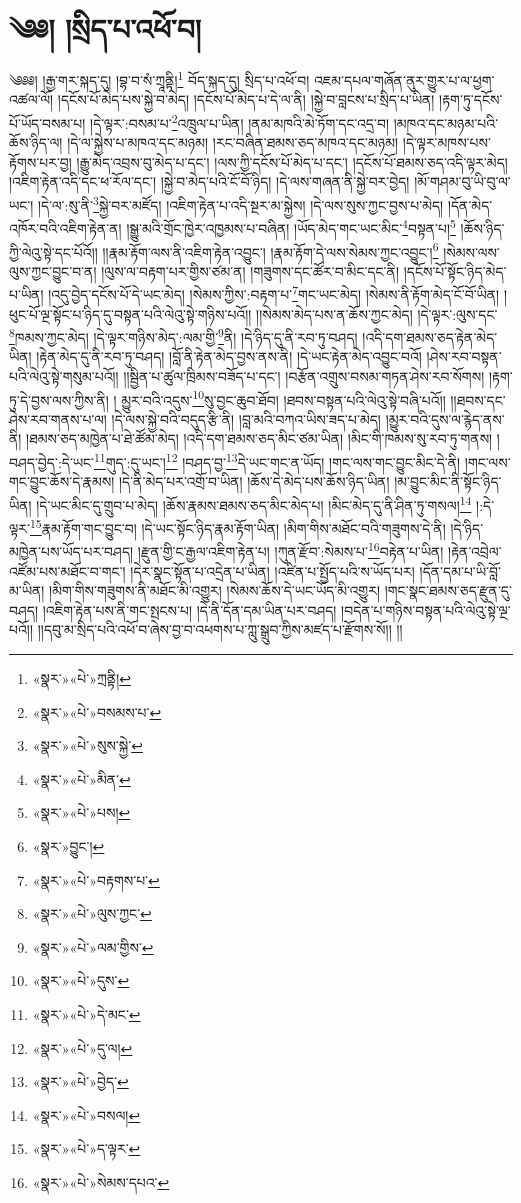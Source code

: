 \chapter{༄༅། །སྲིད་པ་འཕོ་བ།}༄༅༅། །རྒྱ་གར་སྐད་དུ། །བྷ་བ་སཾ་ཀྲཱནྟི།\footnote{«སྣར་»«པེ་»ཀྲནྟི།} བོད་སྐད་དུ། སྲིད་པ་འཕོ་བ། འཇམ་དཔལ་གཞོན་ནུར་གྱུར་པ་ལ་ཕྱག་འཚལ་ལོ། །དངོས་པོ་མེད་པས་སྐྱེ་བ་མེད། །དངོས་པོ་མེད་པ་དེ་ལ་ནི། །སྐྱེ་བ་བླངས་པ་སྲིད་པ་ཡིན། །རྟག་ཏུ་དངོས་པོ་ཡོད་བསམ་པ། །དེ་ལྟར་:བསམ་པ་\footnote{«སྣར་»«པེ་»བསམས་པ་}འཁྲུལ་པ་ཡིན། །ནམ་མཁའི་མེ་ཏོག་དང་འདྲ་བ། །མཁའ་དང་མཉམ་པའི་ཆོས་ཉིད་ལ། །དེ་ལ་སྐྱེས་པ་མཁའ་དང་མཉམ། །རང་བཞིན་ཐམས་ཅད་མཁའ་དང་མཉམ། །དེ་ལྟར་མཁས་པས་རྟོགས་པར་བྱ། །རྒྱུ་མེད་འབྲས་བུ་མེད་པ་དང་། །ལས་ཀྱི་དངོས་པོ་མེད་པ་དང་། །དངོས་པོ་ཐམས་ཅད་འདི་ལྟར་མེད། །འཇིག་རྟེན་འདི་དང་ཕ་རོལ་དང་། །སྐྱེ་བ་མེད་པའི་ངོ་བོ་ཉིད། །དེ་ལས་གཞན་ནི་སྐྱེ་བར་བྱེད། །མོ་གཤམ་བུ་ཡི་བུ་ལ་ཡང་། །དེ་ལ་:སུ་ནི་\footnote{«སྣར་»«པེ་»སུས་སྐྱེ་}སྐྱེ་བར་མཛོད། །འཇིག་རྟེན་པ་འདི་སྔར་མ་སྐྱེས། །དེ་ལས་སུས་ཀྱང་བྱས་པ་མེད། །དོན་མེད་འཁོར་བའི་འཇིག་རྟེན་ན། །སྒྱུ་མའི་གྲོང་ཁྱེར་འཁྱམས་པ་བཞིན། །ཡོད་མེད་གང་ཡང་མིང་\footnote{«སྣར་»«པེ་»མིན་}བསྟན་པ།\footnote{«སྣར་»«པེ་»པས།} །ཆོས་ཉིད་ཀྱི་ལེའུ་སྟེ་དང་པོའོ།། །།རྣམ་རྟོག་ལས་ནི་འཇིག་རྟེན་འབྱུང་། །རྣམ་རྟོག་དེ་ལས་སེམས་ཀྱང་འབྱུང་།\footnote{«སྣར་»བྱུང་།} །སེམས་ལས་ལུས་ཀྱང་བྱུང་བ་ན། །ལུས་ལ་བརྟག་པར་གྱིས་ཙམ་ན། །གཟུགས་དང་ཚོར་བ་མིང་དང་ནི། །དངོས་པོ་སྟོང་ཉིད་མེད་པ་ཡིན། །འདུ་བྱེད་དངོས་པོ་དེ་ཡང་མེད། །སེམས་ཀྱིས་:བརྟག་པ་\footnote{«སྣར་»«པེ་»བརྟགས་པ་}གང་ཡང་མེད། །སེམས་ནི་རྟོག་མེད་ངོ་བོ་ཡིན། །ཕུང་པོ་ལྔ་སྟོང་པ་ཉིད་དུ་བསྟན་པའི་ལེའུ་སྟེ་གཉིས་པའོ།། །།སེམས་མེད་པས་ན་ཆོས་ཀྱང་མེད། །དེ་ལྟར་:ལུས་དང་\footnote{«སྣར་»«པེ་»ལུས་ཀྱང་}ཁམས་ཀྱང་མེད། །དེ་ལྟར་གཉིས་མེད་:ལམ་གྱི་\footnote{«སྣར་»«པེ་»ལམ་གྱིས་}ནི། །དེ་ཉིད་དུ་ནི་རབ་ཏུ་བཤད། །འདི་དག་ཐམས་ཅད་རྟེན་མེད་ཡིན། །རྟེན་མེད་དུ་ནི་རབ་ཏུ་བཤད། །བློ་ནི་རྟེན་མེད་བྱས་ནས་ནི། །དེ་ཡང་རྟེན་མེད་འབྱུང་བའོ། །ཤེས་རབ་བསྟན་པའི་ལེའུ་སྟེ་གསུམ་པའོ།། །།སྦྱིན་པ་ཚུལ་ཁྲིམས་བཟོད་པ་དང་། །བརྩོན་འགྲུས་བསམ་གཏན་ཤེས་རབ་སོགས། །རྟག་ཏུ་དེ་བྱས་ལས་ཀྱིས་ནི། །
མྱུར་བའི་འདུས་\footnote{«སྣར་»«པེ་»དུས་}སུ་བྱང་ཆུབ་ཐོབ། །ཐབས་བསྟན་པའི་ལེའུ་སྟེ་བཞི་པའོ།། །།ཐབས་དང་ཤེས་རབ་གནས་པ་ལ། །དེ་ལས་སྐྱེ་བའི་བདུད་རྩི་ནི། །བླ་མའི་བཀའ་ཡིས་ཟད་པ་མེད། །མྱུར་བའི་དུས་ལ་རྙེད་ནས་ནི། །ཐམས་ཅད་མཁྱེན་པ་ཐེ་ཚོམ་མེད། །འདི་དག་ཐམས་ཅད་མིང་ཙམ་ཡིན། །མིང་གི་ཁམས་སུ་རབ་ཏུ་གནས། །བཤད་བྱེད་:དེ་ཡང་\footnote{«སྣར་»«པེ་»དེ་མང་}གུད་:དུ་ཡང་།\footnote{«སྣར་»«པེ་»དུ་ལ།} །བཤད་བྱ་\footnote{«སྣར་»«པེ་»བྱེད་}དེ་ཡང་གང་ན་ཡོད། །གང་ལས་གང་བྱུང་མིང་དེ་ནི། །གང་ལས་གང་བྱུང་ཆོས་དེ་རྣམས། །དེ་ནི་མེད་པར་འགྲོ་བ་ཡིན། །ཆོས་དེ་མེད་པས་ཆོས་ཉིད་ཡིན། །མ་བྱུང་མིང་ནི་སྟོང་ཉིད་ཡིན། །དེ་ཡང་མིང་དུ་གྲུབ་པ་མེད། །ཆོས་རྣམས་ཐམས་ཅད་མིང་མེད་པ། །མིང་མེད་དུ་ནི་ཤིན་ཏུ་གསལ།\footnote{«སྣར་»«པེ་»བསལ།} །:དེ་ལྟར་\footnote{«སྣར་»«པེ་»ད་ལྟར་}རྣམ་རྟོག་གང་བྱུང་བ། །དེ་ཡང་སྟོང་ཉིད་རྣམ་རྟོག་ཡིན། །མིག་གིས་མཐོང་བའི་གཟུགས་དེ་ནི། །དེ་ཉིད་མཁྱེན་པས་ཡོད་པར་བཤད། །རྫུན་གྱི་ང་རྒྱལ་འཇིག་རྟེན་པ། །ཀུན་རྫོབ་:སེམས་པ་\footnote{«སྣར་»«པེ་»སེམས་དཔའ་}བརྟེན་པ་ཡིན། །རྟེན་འབྲེལ་འཛོམ་པས་མཐོང་བ་གང་། །དེར་སྣང་སྟོན་པ་འདྲེན་པ་ཡིན། །འཛིན་པ་སྤྱོད་པའི་ས་ཡོད་པར། །དོན་དམ་པ་ཡི་བློ་མ་ཡིན། །མིག་གིས་གཟུགས་ནི་མཐོང་མི་འགྱུར། །སེམས་ཆོས་དེ་ཡང་ཡོད་མི་འགྱུར། །གང་སྣང་ཐམས་ཅད་རྫུན་དུ་བཤད། །འཇིག་རྟེན་པས་ནི་གང་སྤངས་པ། །དེ་ནི་དོན་དམ་ཡིན་པར་བཤད། །བདེན་པ་གཉིས་བསྟན་པའི་ལེའུ་སྟེ་ལྔ་པའོ།། །།དབུ་མ་སྲིད་པའི་འཕོ་བ་ཞེས་བྱ་བ་འཕགས་པ་ཀླུ་སྒྲུབ་ཀྱིས་མཛད་པ་རྫོགས་སོ།། །།
